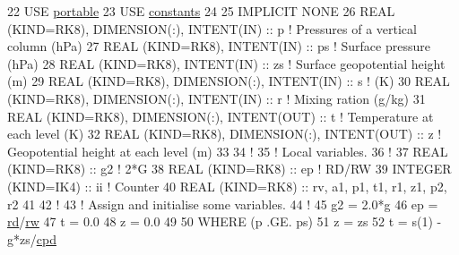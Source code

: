 \begin{DoxyCode}
22 \textcolor{keywordtype}{USE }\hyperlink{namespaceportable}{portable}
23 \textcolor{keywordtype}{USE }\hyperlink{namespaceconstants}{constants}
24 
25 \textcolor{keywordtype}{IMPLICIT NONE}
26 \textcolor{keywordtype}{REAL (KIND=RK8)}, \textcolor{keywordtype}{DIMENSION(:)}, \textcolor{keywordtype}{INTENT(IN)}       :: p    \textcolor{comment}{! Pressures of a vertical column (hPa)}
27 \textcolor{keywordtype}{REAL (KIND=RK8)}, \textcolor{keywordtype}{INTENT(IN)}                     :: ps   \textcolor{comment}{! Surface pressure (hPa)}
28 \textcolor{keywordtype}{REAL (KIND=RK8)}, \textcolor{keywordtype}{INTENT(IN)}                     :: zs   \textcolor{comment}{! Surface geopotential height (m)}
29 \textcolor{keywordtype}{REAL (KIND=RK8)}, \textcolor{keywordtype}{DIMENSION(:)}, \textcolor{keywordtype}{INTENT(IN)}       :: s    \textcolor{comment}{! (K)}
30 \textcolor{keywordtype}{REAL (KIND=RK8)}, \textcolor{keywordtype}{DIMENSION(:)}, \textcolor{keywordtype}{INTENT(IN)}       :: r    \textcolor{comment}{! Mixing ration (g/kg)}
31 \textcolor{keywordtype}{REAL (KIND=RK8)}, \textcolor{keywordtype}{DIMENSION(:)}, \textcolor{keywordtype}{INTENT(OUT)}      :: t    \textcolor{comment}{! Temperature at each level (K)}
32 \textcolor{keywordtype}{REAL (KIND=RK8)}, \textcolor{keywordtype}{DIMENSION(:)}, \textcolor{keywordtype}{INTENT(OUT)}      :: z    \textcolor{comment}{! Geopotential height at each level (m)}
33 
34 \textcolor{comment}{!}
35 \textcolor{comment}{! Local variables.}
36 \textcolor{comment}{!}
37 \textcolor{keywordtype}{REAL (KIND=RK8)}                                 :: g2       \textcolor{comment}{! 2*G}
38 \textcolor{keywordtype}{REAL (KIND=RK8)}                                 :: ep       \textcolor{comment}{! RD/RW}
39 \textcolor{keywordtype}{INTEGER (KIND=IK4)}                              :: ii       \textcolor{comment}{! Counter}
40 \textcolor{keywordtype}{REAL (KIND=RK8)}                                 :: rv, a1, p1, t1, r1, z1, p2, r2
41 
42 \textcolor{comment}{!}
43 \textcolor{comment}{! Assign and initialise some variables.}
44 \textcolor{comment}{!}
45 g2  = 2.0*\hyperlink{namespaceconstants_a046aef138fbc8d05251d4fdc6eb3ee89}{g}
46 ep  = \hyperlink{namespaceconstants_ad91564da82b97ea0d29ce0565565db85}{rd}/\hyperlink{namespaceconstants_a7ef8fc37397fbfbefd3c22883378dcc5}{rw}
47 t   = 0.0
48 z   = 0.0
49 
50 \textcolor{keywordflow}{WHERE} (p .GE. ps)
51     z   = zs
52     t   = s(1) - \hyperlink{namespaceconstants_a046aef138fbc8d05251d4fdc6eb3ee89}{g}*zs/\hyperlink{namespaceconstants_a32354adf3493f59d0fc17b0302b2c368}{cpd}

\end{DoxyCode}
